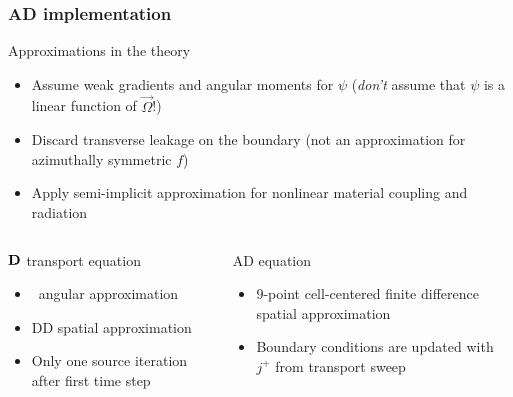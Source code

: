 \documentclass{beamer}
\begin{document}
\begin{frame}
  \frametitle{AD implementation}
  \begin{block}{Approximations in the theory}
    \begin{itemize}
      \item Assume weak gradients and angular moments for $\psi$ (\emph{don't}
        assume that $\psi$ is a linear function of $\vec{\Omega}$!)
      \item Discard transverse leakage on the boundary (not an approximation
        for azimuthally symmetric $f$)
      \item Apply semi-implicit approximation for nonlinear material coupling
        and radiation
    \end{itemize}
  \end{block}
  \vspace{-\baselineskip}
  \begin{columns}[t]
    \begin{column}{.48\textwidth}
\begin{block}{$\mathbf{D}$ transport equation}
  \begin{itemize}
    \item \SN\ angular approximation
    \item DD spatial approximation
    \item Only one source iteration after first time step
  \end{itemize}
\end{block}
    \end{column}
    \begin{column}{.48\textwidth}
\begin{block}{AD equation}
  \begin{itemize}
    \item 9-point cell-centered finite difference spatial approximation
    \item Boundary conditions are updated with $j^+$ from transport sweep
  \end{itemize}
\end{block}
    \end{column}
  \end{columns}
\end{frame}

\end{document}
